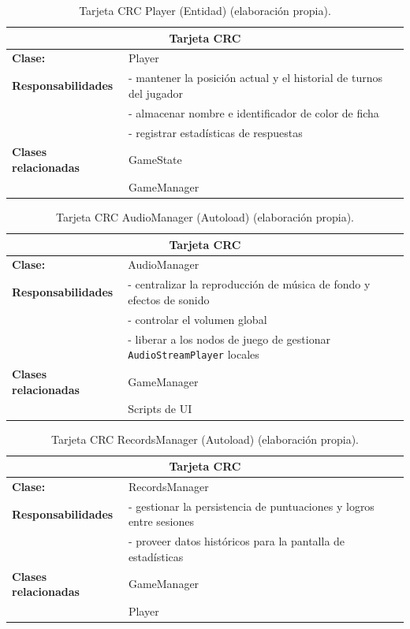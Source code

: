 \begin{table}[H]
\centering
\caption{Tarjeta CRC Player (Entidad) (elaboración propia).\label{tab:crc_player}}
\begin{tabular}{|p{}|p{}|}
\hline
\multicolumn{2}{|c|}{\textbf{Tarjeta CRC}} \\
\hline
\textbf{Clase:} & Player \\
\hline
\textbf{Responsabilidades} & - mantener la posición actual y el historial de turnos del jugador \\
& - almacenar nombre e identificador de color de ficha \\
& - registrar estadísticas de respuestas \\
\hline
\textbf{Clases relacionadas} & GameState \\
& GameManager \\
\hline
\end{tabular}
\end{table}

\begin{table}[H]
\centering
\caption{Tarjeta CRC AudioManager (Autoload) (elaboración propia).\label{tab:crc_audiomanager}}
\begin{tabular}{|p{}|p{}|}
\hline
\multicolumn{2}{|c|}{\textbf{Tarjeta CRC}} \\
\hline
\textbf{Clase:} & AudioManager \\
\hline
\textbf{Responsabilidades} & - centralizar la reproducción de música de fondo y efectos de sonido \\
& - controlar el volumen global \\
& - liberar a los nodos de juego de gestionar \texttt{AudioStreamPlayer} locales \\
\hline
\textbf{Clases relacionadas} & GameManager \\
& Scripts de UI \\
\hline
\end{tabular}
\end{table}

\begin{table}[H]
\centering
\caption{Tarjeta CRC RecordsManager (Autoload) (elaboración propia).\label{tab:crc_recordsmanager}}
\begin{tabular}{|p{}|p{}|}
\hline
\multicolumn{2}{|c|}{\textbf{Tarjeta CRC}} \\
\hline
\textbf{Clase:} & RecordsManager \\
\hline
\textbf{Responsabilidades} & - gestionar la persistencia de puntuaciones y logros entre sesiones \\
& - proveer datos históricos para la pantalla de estadísticas \\
\hline
\textbf{Clases relacionadas} & GameManager \\
& Player \\
\hline
\end{tabular}
\end{table}
